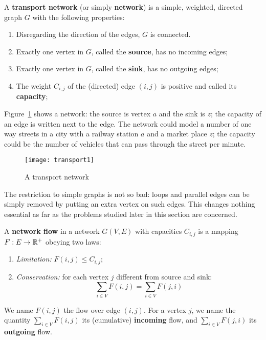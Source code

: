  \begin{definition} {\rm A \textbf{transport
         network} (or simply \textbf{network}) is a simple, weighted,
        directed graph $G$ with the following properties:\label{transportnetwork}
	\begin{enumerate}
		\item Disregarding the direction of the edges, $G$ is connected.		
		\item Exactly one vertex in $G$, called the \textbf{source}, has no incoming edges;
		\item Exactly one vertex in $G$, called the \textbf{sink}, has no outgoing edges;
		\item The weight $C_{i,j}$ of the (directed) edge $(i,j)$ is positive and called its \textbf{capacity};\footnotemark
	\end{enumerate}
}
\end{definition}

Figure~\ref{transport1} shows a network: the source is vertex $a$ and
the sink is $z$; the capacity of an edge is written next to the
edge. The network could model a number of one way streets in a city
with a railway station $a$ and a market place $z$; the capacity could
be the number of vehicles that can pass through the street per minute.

\begin{figure}[ht]
	\centering
	\texttt{[image: transport1]} %
	\caption{A transport network \label{transport1}}
\end{figure}

The restriction to simple graphs is not so bad: loops and parallel
edges can be simply removed by putting an extra vertex on such
edges. This changes nothing essential as far as the problems studied
later in this section are concerned.


\begin{definition}\label{stroming1}
\label{stromingdef}
{\rm A {\bf network flow} in a network $G(V,E)$ with capacities $C_{i,j}$ is a mapping $F : E\to\mathbb{R}^{+}$ obeying two laws:
\begin{enumerate}
	\item \emph{Limitation:}\label{limit1} $F(i,j) \leq C_{i,j}$;
	\item \emph{Conservation:}\label{conserve1} for each vertex $j$ different from source and sink:
	\[\displaystyle \sum_{i \in V} F(i,j) = \sum_{i \in V} F(j,i)\]
\end{enumerate}
We name $F(i,j)$ the flow over edge $(i,j)$. For a vertex $j$, we name
the quantity $\sum_{i \in V} F(i,j)$ its (cumulative) \textbf{incoming} flow, and
$\sum_{i \in V} F(j,i)$ its \textbf{outgoing} flow.  }
\end{definition}

